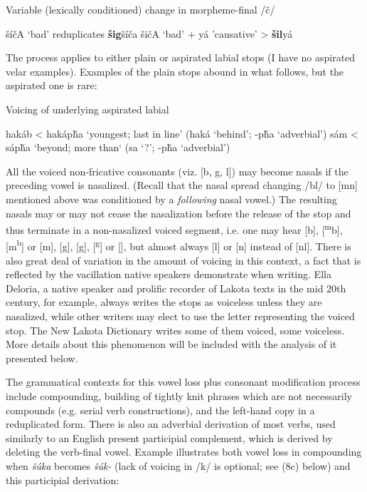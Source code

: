 \documentclass[output=paper]{LSP/langsci}
\begin{document}
\begin{exe}
\ex Variable (lexically conditioned) change in morpheme-final /\v{c}/
\begin{xlist}
\ex \v{s}\'i\v{c}A `bad' reduplicates \textbf{\v{s}ig}\v{s}\'i\v{c}a
\ex \v{s}i\v{c}A `bad' + y\'a 'causative' > \textbf{\v{s}il}y\'a
\end{xlist}
\end{exe}

The process applies to either plain or aspirated labial stops (I have no aspirated velar examples). Examples of the plain stops abound in what follows, but the aspirated one is rare:

\begin{exe}
\ex Voicing of underlying aspirated labial
\begin{xlist}
\ex hak\'ab < hak\'ap\v{h}a `youngest; last in line' (hak\'a `behind'; -p\v{h}a `adverbial')
\ex s\'am < s\'ap\v{h}a `beyond; more than` (sa `?'; -p\v{h}a `adverbial')
\end{xlist}
\end{exe}

All the voiced non-fricative consonants (viz. [b, g, l]) may become nasals if the preceding vowel is nasalized. (Recall that the nasal spread changing /bl/ to [mn] mentioned above was conditioned by a \textit{following} nasal vowel.) The resulting nasals may or may not cease the nasalization before the release of the stop and thus terminate in a non-nasalized voiced segment, i.e. one may hear [b], [\textsuperscript{m}b], [m\textsuperscript{b}] or [m], [g], [\textsuperscript{}g], [\textsuperscript{g}] or [], but almost always [l] or [n] instead of [nl]. There is also great deal of variation in the amount of voicing in this context, a fact that is reflected by the vacillation native speakers demonstrate when writing. Ella Deloria, a native speaker and prolific recorder of Lakota texts in the mid 20th century, for example, always writes the stops as voiceless unless they are nasalized, while other writers may elect to use the letter representing the voiced stop. The New Lakota Dictionary writes some of them voiced, some voiceless. More details about this phenomenon will be included with the analysis of it presented below.

The grammatical contexts for this vowel loss plus consonant modification process include compounding, building of tightly knit phrases which are not necessarily compounds (e.g. serial verb constructions), and the left-hand copy in a reduplicated form. There is also an adverbial derivation of most verbs, used similarly to an English present participial complement, which is derived by deleting the verb-final vowel. Example  illustrates both vowel loss in compounding when \textit{\v{s}\'uka} becomes \textit{\v{s}\'uk-} (lack of voicing in /k/ is optional; see (8c) below) and this participial derivation:
\end{document}
